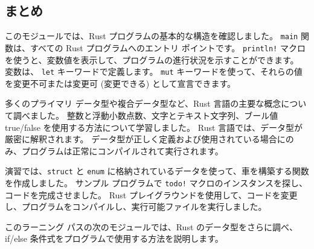 \subsection{まとめ}

このモジュールでは、Rust プログラムの基本的な構造を確認しました。 \texttt{main} 関数は、すべての Rust プログラムへのエントリ ポイントです。 \texttt{println!} マクロを使うと、変数値を表示して、プログラムの進行状況を示すことができます。 変数は、 \texttt{let} キーワードで定義します。 \texttt{mut} キーワードを使って、それらの値を変更不可または変更可 (変更できる) として宣言できます。

多くのプライマリ データ型や複合データ型など、Rust 言語の主要な概念について調べました。 整数と浮動小数点数、文字とテキスト文字列、ブール値 true/false を使用する方法について学習しました。 Rust 言語では、データ型が厳密に解釈されます。 データ型が正しく定義および使用されている場合にのみ、プログラムは正常にコンパイルされて実行されます。

演習では、\texttt{struct} と \texttt{enum} に格納されているデータを使って、車を構築する関数を作成しました。 サンプル プログラムで \texttt{todo!} マクロのインスタンスを探し、コードを完成させました。 Rust プレイグラウンドを使用して、コードを変更し、プログラムをコンパイルし、実行可能ファイルを実行しました。

このラーニング パスの次のモジュールでは、Rust のデータ型をさらに調べ、if/else 条件式をプログラムで使用する方法を説明します。